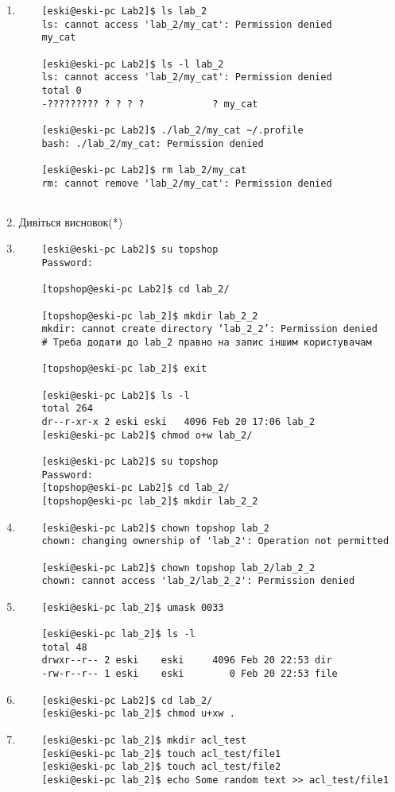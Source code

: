 \documentclass{article}
\begin{document}
\begin{enumerate}
\begin{verbatim}
	\end{verbatim}
	\newpage
	\item \begin{verbatim}
	[eski@eski-pc Lab2]$ ls lab_2
	ls: cannot access 'lab_2/my_cat': Permission denied
	my_cat
	
	[eski@eski-pc Lab2]$ ls -l lab_2
	ls: cannot access 'lab_2/my_cat': Permission denied
	total 0
	-????????? ? ? ? ?            ? my_cat
	
	[eski@eski-pc Lab2]$ ./lab_2/my_cat ~/.profile 
	bash: ./lab_2/my_cat: Permission denied
	
	[eski@eski-pc Lab2]$ rm lab_2/my_cat 
	rm: cannot remove 'lab_2/my_cat': Permission denied
	
	\end{verbatim}
	\item Дивіться висновок(*)
	\item \begin{verbatim}
	[eski@eski-pc Lab2]$ su topshop
	Password: 
	
	[topshop@eski-pc Lab2]$ cd lab_2/
	
	[topshop@eski-pc lab_2]$ mkdir lab_2_2
	mkdir: cannot create directory ‘lab_2_2’: Permission denied
	# Треба додати до lab_2 правно на запис іншим користувачам
	
	[topshop@eski-pc lab_2]$ exit
	
	[eski@eski-pc Lab2]$ ls -l 
	total 264
	dr--r-xr-x 2 eski eski   4096 Feb 20 17:06 lab_2
	[eski@eski-pc Lab2]$ chmod o+w lab_2/
	
	[eski@eski-pc Lab2]$ su topshop
	Password: 
	[topshop@eski-pc Lab2]$ cd lab_2/
	[topshop@eski-pc lab_2]$ mkdir lab_2_2
	\end{verbatim}
	\item \begin{verbatim}
	[eski@eski-pc Lab2]$ chown topshop lab_2
	chown: changing ownership of 'lab_2': Operation not permitted
	
	[eski@eski-pc Lab2]$ chown topshop lab_2/lab_2_2 
	chown: cannot access 'lab_2/lab_2_2': Permission denied
	\end{verbatim}
	\newpage
	\item \begin{verbatim}
	[eski@eski-pc lab_2]$ umask 0033
	
	[eski@eski-pc lab_2]$ ls -l
	total 48
	drwxr--r-- 2 eski    eski     4096 Feb 20 22:53 dir
	-rw-r--r-- 1 eski    eski        0 Feb 20 22:53 file
	\end{verbatim}
	\item \begin{verbatim}
	[eski@eski-pc Lab2]$ cd lab_2/
	[eski@eski-pc lab_2]$ chmod u+xw .
	\end{verbatim}
	\item \begin{verbatim}
	[eski@eski-pc lab_2]$ mkdir acl_test
	[eski@eski-pc lab_2]$ touch acl_test/file1
	[eski@eski-pc lab_2]$ touch acl_test/file2
	[eski@eski-pc lab_2]$ echo Some random text >> acl_test/file1


\end{verbatim}
\end{enumerate}
\end{document}
